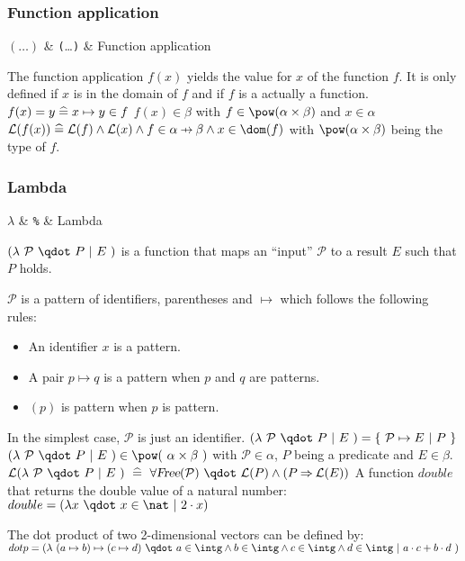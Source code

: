 \subsubsection{Function application}
\label{function_application}
\begin{rrnames}
  $(\ldots)$  & \texttt{(}\ldots\texttt{)}  & Function application
\end{rrnames}
\begin{rodinrefentry}
  \rrdesc
    The function application $f(x)$ yields the value for $x$ of the function $f$.
    It is only defined if $x$ is in the domain of $f$ and if $f$ is a actually a function.
  \rrdef
    $f(x) = y \mathrel{\widehat=} x \mapsto y\in f$
  \rrtypes
    $f(x)\in\beta$ with $f\in\pow(\alpha\cprod\beta)$ and $x\in\alpha$
  \rrwd
    $\wdl(f(x))\defi\wdl(f)\land\wdl(x)\land f\in\alpha\pfun\beta \land x\in\dom(f)$
    with $\pow(\alpha\cprod\beta)$ being the type of $f$.
\end{rodinrefentry}

\subsubsection{Lambda}
\label{lambda}
\newcommand{\lambdapattern}{\mathcal{P}}
\begin{rrnames}
  $\lambda$  & \texttt{\%}  & Lambda
\end{rrnames}
\begin{rodinrefentry}
  \rrdesc
    $(\lambda~\lambdapattern~\qdot~P~|~E~)$ is a function that maps an ``input'' $\lambdapattern$ to
    a result $E$ such that $P$ holds. 

    $\lambdapattern$ is a pattern of identifiers, parentheses and $\mapsto$ which follows the
    following rules:
    \begin{itemize}
    \item An identifier $x$ is a pattern.
    \item A pair $p\mapsto q$ is a pattern when $p$ and $q$ are patterns.
    \item $(p)$ is pattern when $p$ is pattern.
    \end{itemize}
    In the simplest case, $\lambdapattern$ is just an identifier.
  \rrdef
    $(\lambda~\lambdapattern~\qdot~P~|~E~) = \{~\lambdapattern\mapsto E~|~P~\}$
  \rrtypes
    $(\lambda~\lambdapattern~\qdot~P~|~E~)\in\pow(~\alpha\cprod\beta~)$
    with $\lambdapattern\in\alpha$, $P$ being a predicate and $E\in\beta$.
  \rrwd
    $\wdl(\lambda~\lambdapattern~\qdot~P~|~E~)~\defi~
    \forall \freeids{\lambdapattern}~\qdot~\wdl(P)\land (P\limp \wdl(E))$
  \rrex
    A function $double$ that returns the double value of a natural number:\\
    $double = (\lambda x~\qdot~x\in\nat~|~2\cdot x)$

    The dot product of two 2-dimensional vectors can be defined by:\\
    $dotp = (\lambda~(a \mapsto b)\mapsto(c \mapsto d)~\qdot~a\in\intg\land  b\in\intg\land  c\in\intg\land  d\in\intg~|~a\cdot c+b\cdot d~)$
\end{rodinrefentry}



